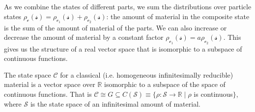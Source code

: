 \documentclass[smallextended]{svjour3}
\numberwithin{equation}{section}
\begin{document}
As we combine the states of different parts, we sum the distributions over particle states $\rho_{\mathcal{c}}(\mathcal{s})=\rho_{\mathcal{c}_1}(\mathcal{s})+\rho_{\mathcal{c}_2}(\mathcal{s})$: the amount of material in the composite state is the sum of the amount of material of the parts. We can also increase or decrease the amount of material by a constant factor $\rho_{\mathcal{c}_1}(\mathcal{s})=a\rho_{\mathcal{c}_2}(\mathcal{s})$. This gives us the structure of a real vector space that is isomorphic to a subspace of continuous functions.

\begin{prop}\label{prop:real_vector_space}
The state space $\mathcal{C}$ for a classical (i.e. homogeneous infinitesimally reducible) material is a vector space over $\mathbb{R}$ isomorphic to a subspace of the space of continuous functions. That is $\mathcal{C} \cong G \subseteq C(\mathcal{S}) \equiv \{\rho:\mathcal{S} \rightarrow \mathbb{R} \; | \; \rho$ is continuous$\}$, where $\mathcal{S}$ is the state space of an infinitesimal amount of material.
\end{prop}
\end{document}
